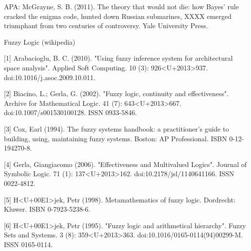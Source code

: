 \documentclass{report}
\begin{document}
APA: McGrayne, S. B. (2011). The theory that would not die: how Bayes' rule cracked the enigma code, hunted down Russian submarines, XXXX emerged triumphant from two centuries of controversy. Yale University Press.


Fuzzy Logic (wikipedia)

[1] Arabacioglu, B. C. (2010). "Using fuzzy inference system for architectural space analysis". Applied Soft Computing. 10 (3): 926<U+2013>937. doi:10.1016/j.asoc.2009.10.011.

[2] Biacino, L.; Gerla, G. (2002). "Fuzzy logic, continuity and effectiveness". Archive for Mathematical Logic. 41 (7): 643<U+2013>667. doi:10.1007/s001530100128. ISSN 0933-5846.

[3] Cox, Earl (1994). The fuzzy systems handbook: a practitioner's guide to building, using, maintaining fuzzy systems. Boston: AP Professional. ISBN 0-12-194270-8.

[4] Gerla, Giangiacomo (2006). "Effectiveness and Multivalued Logics". Journal of Symbolic Logic. 71 (1): 137<U+2013>162. doi:10.2178/jsl/1140641166. ISSN 0022-4812.

[5] H<U+00E1>jek, Petr (1998). Metamathematics of fuzzy logic. Dordrecht: Kluwer. ISBN 0-7923-5238-6.

[6] H<U+00E1>jek, Petr (1995). "Fuzzy logic and arithmetical hierarchy". Fuzzy Sets and Systems. 3 (8): 359<U+2013>363. doi:10.1016/0165-0114(94)00299-M. ISSN 0165-0114.
\end{document}
